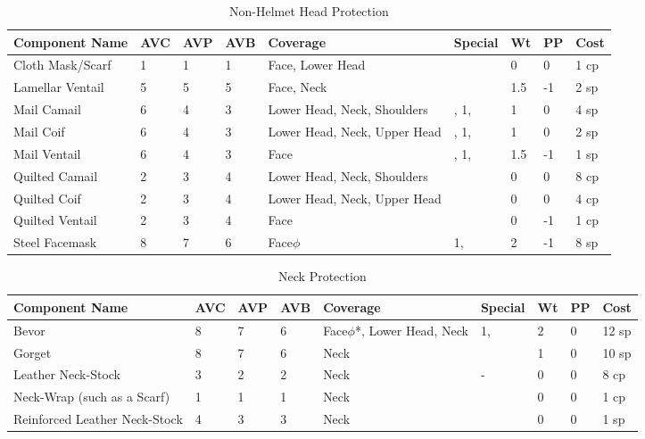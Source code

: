 \documentclass[oneside,11pt,english]{book}
\begin{document}
\begin{longtabu} to 
  \caption{Non-Helmet Head Protection}
  \label{tab:Non-Helmet Head Protection}\\
  Component Name&AVC&AVP&AVB& Coverage& Special& Wt&PP&Cost\\\toprule
  Cloth Mask/Scarf& 1& 1& 1& Face, Lower Head &&0&0&1 cp\\
  Lamellar Ventail& 5& 5& 5& Face, Neck & &1.5 &-1 &2 sp\\
  Mail Camail& 6& 4& 3& Lower Head, Neck, Shoulders &,  1, & 1& 0& 4 sp\\
  Mail Coif& 6& 4& 3& Lower Head, Neck, Upper Head& ,  1, & 1& 0& 2 sp\\
  Mail Ventail& 6& 4& 3& Face& ,  1, & 1.5 &-1& 1 sp\\
  Quilted Camail& 2& 3& 4& Lower Head, Neck, Shoulders& & 0& 0& 8 cp\\
  Quilted Coif& 2& 3& 4& Lower Head, Neck, Upper Head& & 0& 0& 4 cp\\
  Quilted Ventail& 2& 3& 4& Face& & 0 &-1& 1 cp\\
  Steel Facemask& 8& 7& 6& Face\hyperref[sec:Weak Spots]{$\phi$}&  1, & 2 &-1& 8 sp\\
\end{longtabu}

\begin{longtabu} to 
  \caption{Neck Protection}
  \label{tab:Neck Protection}\\
  Component Name&AVC&AVP&AVB& Coverage& Special& Wt&PP& Cost\\\toprule
  Bevor& 8& 7& 6& Face\hyperref[sec:Weak Spots]{$\phi$}*, Lower Head, Neck&  1, & 2& 0& 12 sp\\
  Gorget& 8& 7& 6& Neck& & 1& 0& 10 sp\\
  Leather Neck-Stock& 3& 2& 2& Neck &-& 0& 0& 8 cp\\
  Neck-Wrap (such as a Scarf)& 1& 1& 1& Neck& & 0& 0& 1 cp\\
  Reinforced Leather Neck-Stock& 4& 3& 3& Neck& & 0& 0& 1 sp\\
\end{longtabu}
\end{document}
